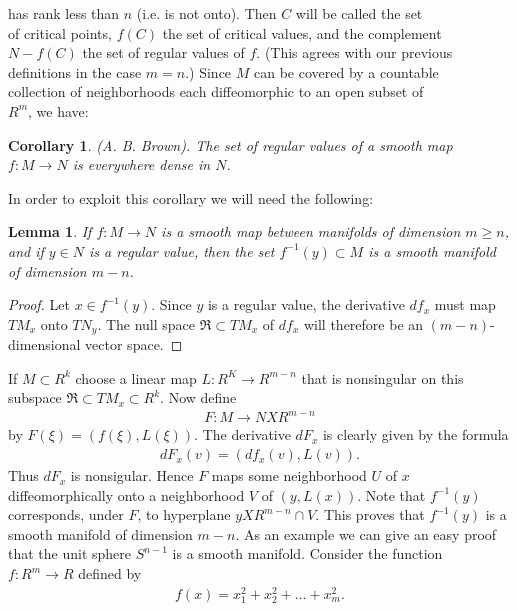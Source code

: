 \documentclass[12pt, openany, closeany]{book}
\newtheorem{lemma}{Lemma}
\theoremstyle{corollary}
\newtheorem*{corollary}{Corollary}
\begin{document}
  has rank less than $n$ (i.e. is not onto). Then $C$ will be called the set \\
  of critical points, $f(C)$ the set of critical values, and the complement \\
  $N - f(C)$ the set of regular values of $f$. (This agrees with our previous \\
  definitions in the case $m = n$.) Since $M$ can be covered by a countable \\
  collection of neighborhoods each diffeomorphic to an open subset of \\
  $R^m$, we have:
  \begin{corollary}
  (A. B. Brown). The set of regular values of a smooth map $f: M\to N$ is everywhere dense in $N$.
  \end{corollary}
  In order to exploit this corollary we will need the following:
  \begin{lemma}
  If $f: M \to N$ is a smooth map between manifolds of dimension $m\geq n$, and if $y\in N$ is a regular value, then the set $f^{-1}(y) \subset M$ is a smooth manifold of dimension $m - n$.
  \end{lemma}
  \begin{proof} Let $x\in f^{-1}(y)$. Since $y$ is a regular value, the derivative $df_{x}$ must map $TM_{x}$ onto $TN_{y}$. The null space $\Re \subset TM_{x}$ of $df_{x}$ will therefore be an $(m - n)$-dimensional vector space.
  \end{proof} 
    If $M \subset R^{k}$ choose a linear map $L : R^K \to R^{m-n}$ that is nonsingular on this subspace $\Re \subset TM_{x} \subset R^k$. Now define
    \begin{align*}
    F : M \to N X R^{m-n}
    \end{align*}
    by $F(\xi) = (f(\xi), L(\xi))$. The derivative $dF_{x}$ is clearly given by the formula
    \begin{align*}
      dF_{x}(v) = (df_{x}(v), L(v)).
    \end{align*}
    Thus $dF_{x}$ is nonsigular. Hence $F$ maps some neighborhood $U$ of $x$ diffeomorphically onto a neighborhood $V$ of $(y, L(x))$. Note that $f^{-1}(y)$ corresponds, under $F$, to hyperplane $y X R^{m-n}\cap V$. This proves that $f^{-1}(y)$ is a smooth manifold of dimension $m - n$. 
    As an example we can give an easy proof that the unit sphere $S^{n-1}$ is a smooth manifold. Consider the function $f : R^m \to R$ defined by
    \begin{align*}
      f(x) = x^2_{1} + x^2_{2} + ... + x^2_{m}.
    \end{align*}
\end{document}
